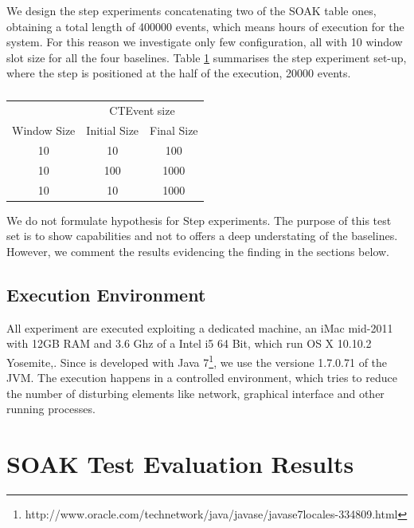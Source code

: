 We design the step experiments concatenating two of the SOAK table ones, obtaining a total length of 400000 events, which means hours of execution for the system. For this reason we investigate only few configuration, all with 10  window slot size for all the four baselines. Table \ref{tab:steptests} summarises the step experiment set-up, where the step is positioned at the half of the execution, 20000 events.
\begin{table}[htb]
\centering
 \begin{tabular}{c|c|c}
	  	\hline
	  	&\multicolumn{2}{c}{CTEvent size}  \\
		Window Size & Initial Size & Final Size\\
		\hline
		\hline
		 10 & 10 & 100\\
		  10 & 100 & 1000\\
		 10 & 10 & 1000\\
		
		\hline 
 \end{tabular}
	\vspace{10pt}
 \caption{}
\label{tab:steptests}
\end{table}

We do not formulate hypothesis for Step experiments. The purpose of this test set is to show \name capabilities and not to offers a deep understating of the baselines. However, we comment the results evidencing the finding in the sections below.

\subsection{Execution Environment}\label{sec:execution-environment}

All experiment are executed exploiting a dedicated machine, an iMac mid-2011 with 12GB RAM and 3.6 Ghz of a Intel i5 64 Bit, which run OS X 10.10.2 Yosemite,. Since \name is developed with Java 7\footnote{http://www.oracle.com/technetwork/java/javase/javase7locales-334809.html}, we use the versione 1.7.0.71 of the JVM.
The execution happens in a controlled environment, which tries to reduce the number of disturbing elements like network, graphical interface and other running processes.

\section{SOAK Test Evaluation Results}\label{sec:soakres}

